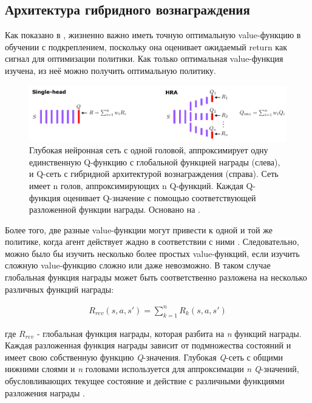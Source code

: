\subsection{Архитектура гибридного вознаграждения}

Как показано в \cite{seijen2017hybrid}, жизненно важно иметь точную оптимальную value-функцию в обучении с подкреплением, поскольку она оценивает ожидаемый return как сигнал для оптимизации политики. Как только оптимальная value-функция изучена, из неё можно получить оптимальную политику.

\begin{figure}[ht!]
    \center
    \includegraphics [scale=0.80] {my_folder/images/ch2/hybrid-reward.png}
    \caption{Глубокая нейронная сеть с одной головой, аппроксимирует одну единственную Q-функцию с глобальной функцией награды (слева), и Q-сеть с гибридной архитектурой вознаграждения (справа). Сеть имеет n голов, аппроксимирующих n Q-функций. Каждая Q-функция оценивает Q-значение с помощью соответствующей разложенной функции награды. Основано на \cite{seijen2017hybrid}.}
    \label{fig:ch2-hybrid-reward}
\end{figure}

Более того, две разные value-функции могут привести к одной и той же политике, когда агент действует жадно в соответствии с ними \cite{seijen2017hybrid}. Следовательно, можно было бы изучить несколько более простых value-функций, если изучить сложную value-функцию сложно или даже невозможно. В таком случае глобальная функция награды может быть соответственно разложена на несколько различных функций награды:

\begin{equation}
    \begin{multlined}
        R_{rev}(s, a, s') = \sum^n_{k=1} R_k (s, a, s')
    \end{multlined}
\end{equation}

где $R_{rev}$ - глобальная функция награды, которая разбита на \textit{n} функций награды. Каждая разложенная функция награды зависит от подмножества состояний и имеет свою собственную функцию \textit{Q}-значения. Глубокая \textit{Q}-сеть с общими нижними слоями и \textit{n} головами используется для аппроксимации \textit{n} \textit{Q}-значений, обусловливающих текущее состояние и действие с различными функциями разложения награды .

